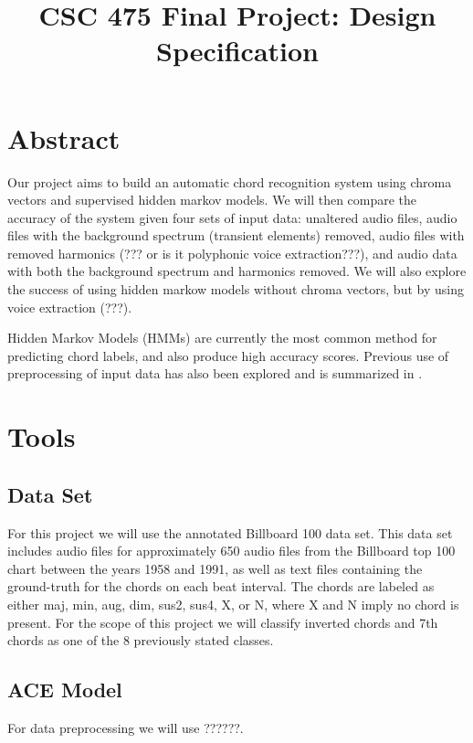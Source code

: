 \documentclass{article}
\title{CSC 475 Final Project: Design Specification}
\begin{document}
%
\maketitle
%

\section{Abstract}\label{sec:desoutline}
Our project aims to build an automatic chord recognition system using chroma vectors and supervised hidden markov 
models. We will then compare the accuracy of the system given four sets of input data: unaltered audio files, audio 
files with the background spectrum (transient elements) removed, audio files with removed harmonics (??? or is it 
polyphonic voice extraction???), and audio data with both the background spectrum and harmonics removed. We will 
also explore the success of using hidden markow models without chroma vectors, but by using voice extraction (???).

Hidden Markov Models (HMMs) are currently the most common method for predicting chord labels, and also 
produce high accuracy scores. Previous use of preprocessing of input data has also been explored and is
summarized in \cite{McVicar:00}.

\section{Tools}\label{sec:tools}

\subsection{Data Set}

For this project we will use the annotated Billboard 100 data set. This data set includes audio files for 
approximately 650 audio files from the Billboard top 100 chart between the years 1958 and 1991, as well as text
files containing the ground-truth for the chords on each beat interval\cite{Burgoyne:07}. The chords are labeled
as either maj, min, aug, dim, sus2, sus4, X, or N, where X and N imply no chord is present. For the scope of this
project we will classify inverted chords and 7th chords as one of the 8 previously stated classes.

\subsection{ACE Model}

For data preprocessing we will use ??????. 
\end{document}
